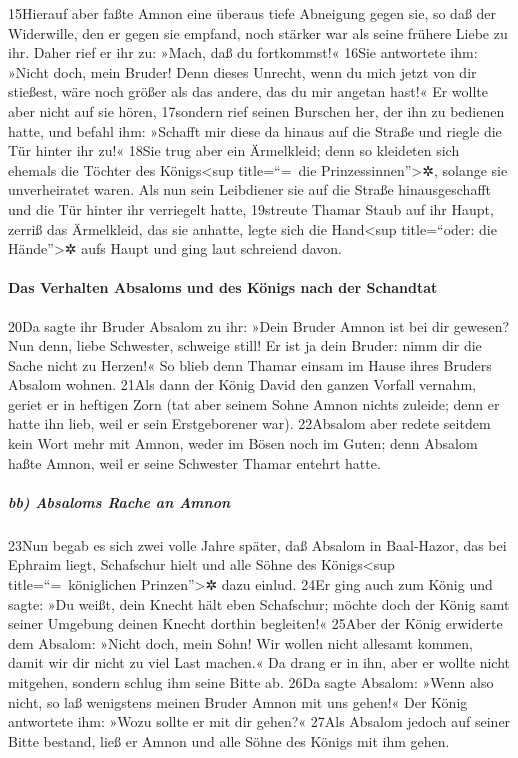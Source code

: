 15Hierauf aber faßte Amnon eine überaus tiefe Abneigung gegen sie, so
daß der Widerwille, den er gegen sie empfand, noch stärker war als seine
frühere Liebe zu ihr. Daher rief er ihr zu: »Mach, daß du fortkommst!«
16Sie antwortete ihm: »Nicht doch, mein Bruder! Denn dieses Unrecht,
wenn du mich jetzt von dir stießest, wäre noch größer als das andere,
das du mir angetan hast!« Er wollte aber nicht auf sie hören, 17sondern
rief seinen Burschen her, der ihn zu bedienen hatte, und befahl ihm:
»Schafft mir diese da hinaus auf die Straße und riegle die Tür hinter
ihr zu!« 18Sie trug aber ein Ärmelkleid; denn so kleideten sich ehemals
die Töchter des Königs\textless sup title=``=~die
Prinzessinnen''\textgreater✲, solange sie unverheiratet waren. Als nun
sein Leibdiener sie auf die Straße hinausgeschafft und die Tür hinter
ihr verriegelt hatte, 19streute Thamar Staub auf ihr Haupt, zerriß das
Ärmelkleid, das sie anhatte, legte sich die Hand\textless sup
title=``oder: die Hände''\textgreater✲ aufs Haupt und ging laut
schreiend davon.

\hypertarget{das-verhalten-absaloms-und-des-kuxf6nigs-nach-der-schandtat}{%
\paragraph{Das Verhalten Absaloms und des Königs nach der
Schandtat}\label{das-verhalten-absaloms-und-des-kuxf6nigs-nach-der-schandtat}}

20Da sagte ihr Bruder Absalom zu ihr: »Dein Bruder Amnon ist bei dir
gewesen? Nun denn, liebe Schwester, schweige still! Er ist ja dein
Bruder: nimm dir die Sache nicht zu Herzen!« So blieb denn Thamar einsam
im Hause ihres Bruders Absalom wohnen. 21Als dann der König David den
ganzen Vorfall vernahm, geriet er in heftigen Zorn (tat aber seinem
Sohne Amnon nichts zuleide; denn er hatte ihn lieb, weil er sein
Erstgeborener war). 22Absalom aber redete seitdem kein Wort mehr mit
Amnon, weder im Bösen noch im Guten; denn Absalom haßte Amnon, weil er
seine Schwester Thamar entehrt hatte.

\hypertarget{bb-absaloms-rache-an-amnon}{%
\subparagraph{bb) Absaloms Rache an
Amnon}\label{bb-absaloms-rache-an-amnon}}

23Nun begab es sich zwei volle Jahre später, daß Absalom in Baal-Hazor,
das bei Ephraim liegt, Schafschur hielt und alle Söhne des
Königs\textless sup title=``=~königlichen Prinzen''\textgreater✲ dazu
einlud. 24Er ging auch zum König und sagte: »Du weißt, dein Knecht hält
eben Schafschur; möchte doch der König samt seiner Umgebung deinen
Knecht dorthin begleiten!« 25Aber der König erwiderte dem Absalom:
»Nicht doch, mein Sohn! Wir wollen nicht allesamt kommen, damit wir dir
nicht zu viel Last machen.« Da drang er in ihn, aber er wollte nicht
mitgehen, sondern schlug ihm seine Bitte ab. 26Da sagte Absalom: »Wenn
also nicht, so laß wenigstens meinen Bruder Amnon mit uns gehen!« Der
König antwortete ihm: »Wozu sollte er mit dir gehen?« 27Als Absalom
jedoch auf seiner Bitte bestand, ließ er Amnon und alle Söhne des Königs
mit ihm gehen.


